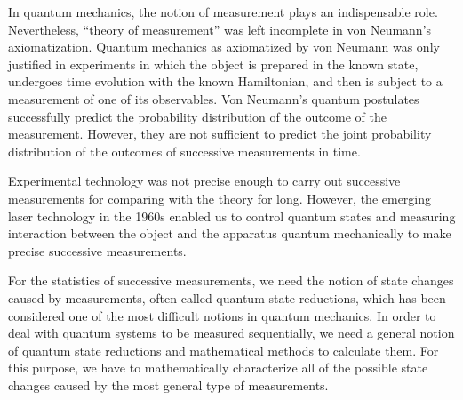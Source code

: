 \documentclass[graybox]{svmult}
\begin{document}
In quantum mechanics, the notion of measurement plays an indispensable role.
Nevertheless, ``theory of measurement'' was left incomplete in von Neumann's
axiomatization.
Quantum mechanics as axiomatized by von Neumann was only justified in 
experiments in which the object is prepared in the known state, undergoes time
evolution with the known Hamiltonian, and then is subject to a measurement
of one of its observables.  Von Neumann's quantum postulates successfully predict
the probability distribution of the outcome of the measurement. 
 However, they are not sufficient to predict the joint probability
distribution of the outcomes of successive measurements in time.

Experimental technology was not precise enough to carry out successive 
measurements for comparing with the theory for long.
However, the emerging laser technology in the 1960s
enabled us to control quantum states and measuring interaction between 
the object and the apparatus quantum mechanically to make 
precise successive measurements.

For  the statistics of successive measurements, we need the notion of state changes caused 
by measurements, often called quantum state reductions,
which has been considered one of the most difficult notions in quantum mechanics.
In order to deal with quantum systems to be measured sequentially, 
we need a general notion of quantum state reductions and mathematical methods
to calculate them.  For this purpose, we have to mathematically characterize 
all of the possible state changes caused by the most general type of measurements.
\end{document}
